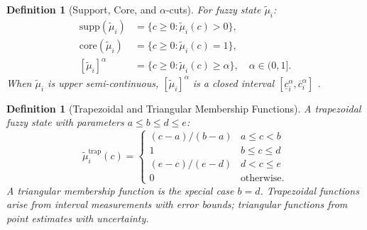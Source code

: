 \documentclass[twocolumn,10pt,a4paper]{article}
\newtheorem{definition}[theorem]{Definition}
\begin{document}
\begin{definition}[Support, Core, and $\alpha$-cuts]
\label{def:alpha-cut}
For fuzzy state $\tilde{\mu}_i$:
\begin{align}
  \mathrm{supp}(\tilde{\mu}_i) &= \{c\geq 0:\tilde{\mu}_i(c)>0\}, \\
  \mathrm{core}(\tilde{\mu}_i) &= \{c\geq 0:\tilde{\mu}_i(c)=1\}, \\
  [\tilde{\mu}_i]^\alpha        &= \{c\geq 0:\tilde{\mu}_i(c)\geq\alpha\},
  \quad\alpha\in(0,1].
\end{align}
When $\tilde{\mu}_i$ is upper semi-continuous, $[\tilde{\mu}_i]^\alpha$ is a
closed interval $[\underline{c}_i^\alpha,\overline{c}_i^\alpha]$
\cite{Zadeh1978,Zimmermann2001book}.
\end{definition}

\begin{definition}[Trapezoidal and Triangular Membership Functions]
\label{def:tri-trap}
A \emph{trapezoidal} fuzzy state with parameters $a\leq b\leq d\leq e$:
\begin{equation}
  \tilde{\mu}_i^{\mathrm{trap}}(c) =
  \begin{cases}
    (c-a)/(b-a) & a\leq c < b \\
    1           & b\leq c\leq d \\
    (e-c)/(e-d) & d< c\leq e \\
    0           & \text{otherwise.}
  \end{cases}
  \label{eq:trapezoid}
\end{equation}
A \emph{triangular} membership function is the special case $b=d$.  Trapezoidal
functions arise from interval measurements with error bounds; triangular
functions from point estimates with uncertainty.
\end{definition}
\end{document}
